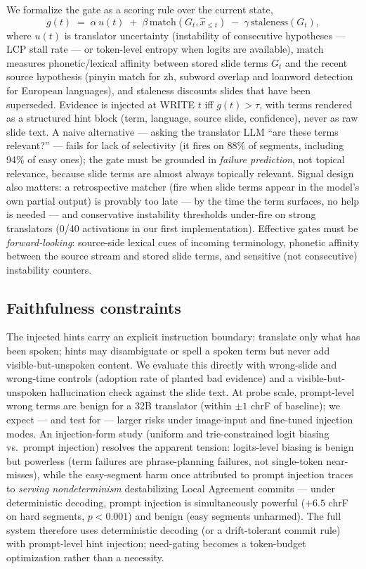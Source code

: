 We formalize the gate as a scoring rule over the current state,
\begin{equation}
  g(t) \;=\; \alpha\,u(t) \;+\; \beta\,\mathrm{match}(G_t, \hat{x}_{\le t})
  \;-\; \gamma\,\mathrm{staleness}(G_t),
  \label{eq:gate}
\end{equation}
where $u(t)$ is translator uncertainty (instability of consecutive hypotheses
--- LCP stall rate --- or token-level entropy when logits are available),
$\mathrm{match}$ measures phonetic/lexical affinity between stored slide terms
$G_t$ and the recent source hypothesis (pinyin match for zh, subword overlap
and loanword detection for European languages), and staleness discounts slides
that have been superseded. Evidence is injected at WRITE $t$ iff
$g(t) > \tau$, with terms rendered as a structured hint block (term, language,
source slide, confidence), never as raw slide text. A naive alternative ---
asking the translator LLM ``are these terms relevant?'' --- fails for lack of
selectivity (it fires on 88\% of segments, including 94\% of easy ones); the
gate must be grounded in \emph{failure prediction}, not topical relevance,
because slide terms are almost always topically relevant. Signal design also
matters: a retrospective matcher (fire when slide terms appear in the model's
own partial output) is provably too late --- by the time the term surfaces, no
help is needed --- and conservative instability thresholds under-fire on strong
translators (0/40 activations in our first implementation). Effective gates
must be \emph{forward-looking}: source-side lexical cues of incoming
terminology, phonetic affinity between the source stream and stored slide
terms, and sensitive (not consecutive) instability counters.

\subsection{Faithfulness constraints}

The injected hints carry an explicit instruction boundary: translate only what
has been spoken; hints may disambiguate or spell a spoken term but never add
visible-but-unspoken content. We evaluate this directly with wrong-slide and
wrong-time controls (adoption rate of planted bad evidence) and a
visible-but-unspoken hallucination check against the slide text. At probe
scale, prompt-level wrong terms are benign for a 32B translator (within
$\pm1$ chrF of baseline); we expect --- and test for --- larger risks under
image-input and fine-tuned injection modes. An injection-form study
(uniform and trie-constrained logit biasing vs.\ prompt injection) resolves
the apparent tension: logits-level biasing is benign but powerless (term
failures are phrase-planning failures, not single-token near-misses), while
the easy-segment harm once attributed to prompt injection traces to
\emph{serving nondeterminism} destabilizing Local Agreement commits --- under
deterministic decoding, prompt injection is simultaneously powerful ($+6.5$
chrF on hard segments, $p{<}0.001$) and benign (easy segments unharmed). The
full system therefore uses deterministic decoding (or a drift-tolerant commit
rule) with prompt-level hint injection; need-gating becomes a token-budget
optimization rather than a necessity.

